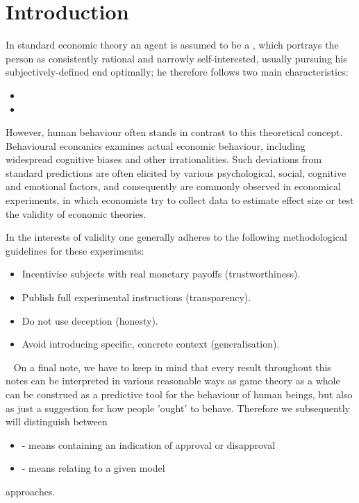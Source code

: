 \chapter*{Introduction} 


In standard economic theory an agent is assumed to be a , which portrays the person as consistently rational and narrowly self-interested, usually pursuing his subjectively-defined end optimally; he therefore follows two main characteristics:
\begin{itemize}
	\item {}
	\item {}
\end{itemize}

However, human behaviour often stands in contrast to this theoretical concept. Behavioural economics examines actual economic behaviour, including widespread cognitive biases and other irrationalities. Such deviations from standard predictions are often elicited by various psychological, social, cognitive and emotional factors, and consequently are commonly observed in economical experiments, in which economists try to collect data to estimate effect size or test the validity of economic theories.

	In the interests of validity one generally adheres to the following methodological guidelines for these experiments: 
	\begin{itemize}
		\item Incentivise subjects with real monetary payoffs (trustworthiness).
		\item Publish full experimental instructions (transparency).
		\item Do not use deception (honesty).
		\item Avoid introducing specific, concrete context (generalisation).
	\end{itemize}	
~\newline	
On a final note, we have to keep in mind that every result throughout this notes can be interpreted in various reasonable ways as game theory as a whole can be construed as a predictive tool for the behaviour of human beings, but also as just a suggestion for how people 'ought' to behave. Therefore we subsequently will distinguish between
\begin{itemize}
	\item {} - means containing an indication of approval or disapproval
	\item {} - means relating to a given model
\end{itemize}
approaches.